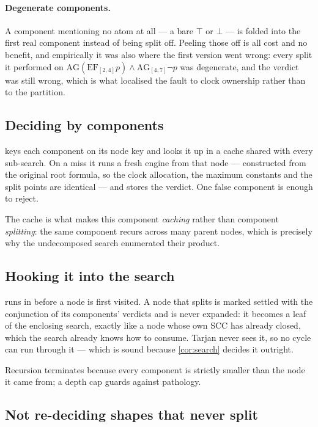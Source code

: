 \paragraph{Degenerate components.} A component mentioning no atom at all --- a
bare $\top$ or $\bot$ --- is folded into the first real component instead of
being split off. Peeling those off is all cost and no benefit, and empirically
it was also where the first version went wrong: every split it performed on
$\mathrm{AG}(\mathrm{EF}_{[2,4]}p)\wedge\mathrm{AG}_{[4,7]}\neg p$ was
degenerate, and the verdict was still wrong, which is what localised the fault
to clock ownership rather than to the partition.

\subsection{Deciding by components}

 keys each component on its node key and looks it
up in a cache shared with every sub-search. On a miss it runs a fresh engine
from that node --- constructed from the original root formula, so the clock
allocation, the maximum constants and the split points are identical --- and
stores the verdict. One false component is enough to reject.

The cache is what makes this component \emph{caching} rather than component
\emph{splitting}: the same component recurs across many parent nodes, which is
precisely why the undecomposed search enumerated their product.

\subsection{Hooking it into the search}

 runs in  before a node is first visited. A
node that splits is marked settled with the conjunction of its components'
verdicts and is never expanded: it becomes a leaf of the enclosing search,
exactly like a node whose own SCC has already closed, which the search already
knows how to consume. Tarjan never sees it, so no cycle can run through it ---
which is sound because \cref{cor:search} decides it outright.

Recursion terminates because every component is strictly smaller than the node
it came from; a depth cap guards against pathology.

\subsection{Not re-deciding shapes that never split}


